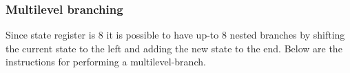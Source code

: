 

\subsubsection{Multilevel branching}
Since state register is 8 it is possible to have up-to 8 nested branches by
shifting the current state to the left and adding the new state to the
end. Below  are the
instructions for performing a multilevel-branch.


